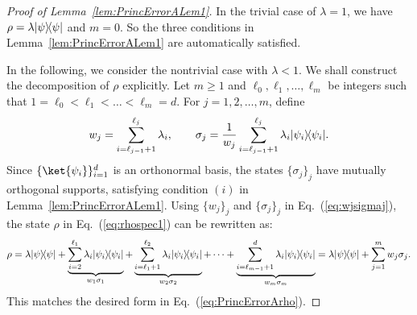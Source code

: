 \documentclass[aps,prl,twocolumn,nofootinbib,superscriptaddress,10pt]{revtex4-2}
\let\originalleft\left
\let\originalright\right
\renewcommand{\left}{\mathopen{}\mathclose\bgroup\originalleft}
\renewcommand{\right}{\aftergroup\egroup\originalright}
\newcommand{\ketbra}[2]{\ensuremath{\left|#1\right\rangle\!\left\langle#2\right|}}
\theoremstyle{plain}
\theoremstyle{definition}
\newcommand{\caH}{\mathcal{H}}
\newcommand{\eref}[1]{Eq.~\textup{(\ref{#1})}}
\newcommand{\lref}[1]{Lemma~\ref{#1}}
\begin{document}
\begin{proof}[Proof of \lref{lem:PrincErrorALem1}] 
	In the trivial case of $\lambda=1$, we have $\rho = \lambda\ketbra{\psi}{\psi}$ and $m=0$. 
	So the three conditions in \lref{lem:PrincErrorALem1} are automatically satisfied. 
	
	In the following, we consider the nontrivial case with $\lambda<1$.  
	We shall construct the decomposition of $\rho$ explicitly.
	Let $m\geq 1$ and $\ell_0, \ell_1, \dots,\ell_m$ be integers such that
	$1=\ell_0< \ell_1 <\dots<\ell_m=d$.
	For $j=1,2,\dots,m$, define
	\begin{align}\label{eq:wjsigmaj}
		w_j =\sum_{i=\ell_{j-1}+1}^{\ell_j} \lambda_i,  
		\qquad 
		\sigma_j =\frac{1}{w_j} \sum_{i=\ell_{j-1}+1}^{\ell_j} \lambda_i \ketbra{\psi_i}{\psi_i}. 
	\end{align}
	Since \(\{\ket{\psi_i}\}_{i=1}^d\) is an orthonormal basis, the states \(\{\sigma_j\}_j\) have mutually orthogonal supports, satisfying condition \((i)\) in \lref{lem:PrincErrorALem1}. 
	Using $\{w_j\}_j$ and $\{\sigma_j\}_j$ in \eref{eq:wjsigmaj}, the state $\rho$ in \eref{eq:rhospec1} can be rewritten as:
	\begin{align}
		\rho=
		\lambda \ketbra{\psi}{\psi} 
		+ \underbrace{\sum_{i=2}^{\ell_1} \lambda_i \ketbra{\psi_i}{\psi_i}}_{w_1 \sigma_1}
		+ \underbrace{\sum_{i=\ell_1+1}^{\ell_2} \lambda_i \ketbra{\psi_i}{\psi_i}}_{w_2 \sigma_2}
		+ \cdots
		+ \underbrace{\sum_{i=\ell_{m-1}+1}^{d} \lambda_i \ketbra{\psi_i}{\psi_i}}_{w_m \sigma_m}
		= \lambda\ketbra{\psi}{\psi} + \sum_{j=1}^m w_j \sigma_j  . 
	\end{align}
	This matches the desired form in \eref{eq:PrincErrorArho}.


\end{proof}
\end{document}
